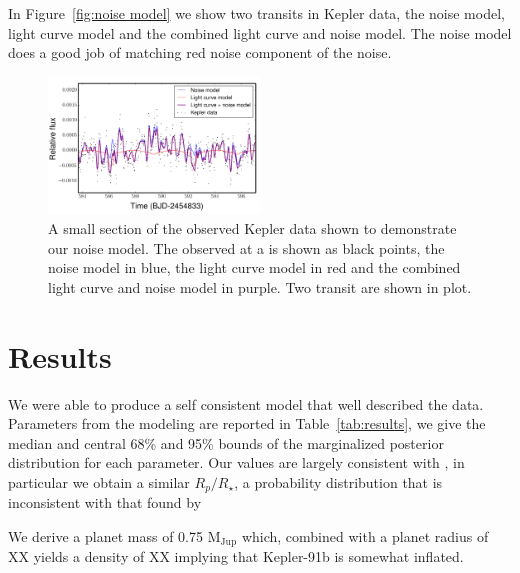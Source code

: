 \documentclass[apjl]{emulateapj}
\begin{document}
In Figure~\ref{fig:noise model} we show two transits in Kepler data, the noise model, light curve model and the combined light curve and noise model. The noise model does a good job of matching red noise component of the noise.

\begin{figure}
\includegraphics[width=0.50\textwidth]{noisemodel.png}
\caption{A small section of the observed Kepler data shown to demonstrate our noise model. The observed at a is shown as black points, the noise model in blue, the light curve model in red and the combined light curve and noise model in purple. Two transit are shown in plot. }
\label{fig:filter}
\end{figure}


\section{Results}
We were able to produce a self consistent model that well described the data. Parameters from the modeling are reported in Table~\ref{tab:results}, we give the median and central 68\% and 95\% bounds of the marginalized posterior distribution for each parameter. Our values are largely consistent with \citet{lillo13}, in particular we obtain a similar $R_{p}/R_{\star}$, a probability distribution that is inconsistent with that found by \citet{sliski14}

We derive a planet mass of 0.75 M$_{\textrm{Jup}}$ which, combined with a planet radius of XX yields a density of XX implying that Kepler-91b is somewhat inflated. 
\end{document}
